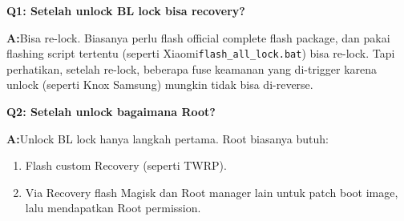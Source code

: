 
\textbf{Q1: Setelah unlock BL lock bisa recovery?}\par

\textbf{A:}Bisa re-lock. Biasanya perlu flash official complete flash package, dan pakai flashing script tertentu (seperti Xiaomi\texttt{flash\_all\_lock.\allowbreak bat}) bisa re-lock. Tapi perhatikan, setelah re-lock, beberapa fuse keamanan yang di-trigger karena unlock (seperti Knox Samsung) mungkin tidak bisa di-reverse.

\textbf{Q2: Setelah unlock bagaimana Root?}\par

\textbf{A:}Unlock BL lock hanya langkah pertama. Root biasanya butuh:

\begin{enumerate}
  \item Flash custom Recovery (seperti TWRP).
  \item Via Recovery flash Magisk dan Root manager lain untuk patch boot image, lalu mendapatkan Root permission.
\end{enumerate}
